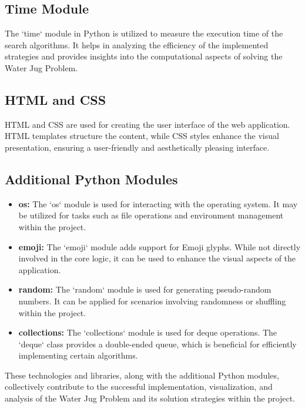 \documentclass[12pt]{article}
\begin{document}
\subsection*{Time Module}

The `time` module in Python is utilized to measure the execution time of the search algorithms. It helps in analyzing the efficiency of the implemented strategies and provides insights into the computational aspects of solving the Water Jug Problem.

\subsection*{HTML and CSS}

HTML and CSS are used for creating the user interface of the web application. HTML templates structure the content, while CSS styles enhance the visual presentation, ensuring a user-friendly and aesthetically pleasing interface.

\subsection*{Additional Python Modules}

\begin{itemize}
    \item \textbf{os:} The `os` module is used for interacting with the operating system. It may be utilized for tasks such as file operations and environment management within the project.
    
    \item \textbf{emoji:} The `emoji` module adds support for Emoji glyphs. While not directly involved in the core logic, it can be used to enhance the visual aspects of the application.
    
    \item \textbf{random:} The `random` module is used for generating pseudo-random numbers. It can be applied for scenarios involving randomness or shuffling within the project.
    
    \item \textbf{collections:} The `collections` module is used for deque operations. The `deque` class provides a double-ended queue, which is beneficial for efficiently implementing certain algorithms.
\end{itemize}

These technologies and libraries, along with the additional Python modules, collectively contribute to the successful implementation, visualization, and analysis of the Water Jug Problem and its solution strategies within the project.
\end{document}
